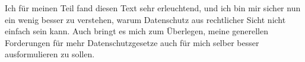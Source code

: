 \documentclass[a4paper,ngerman,11pt]{scrartcl}
\begin{document}
Ich für meinen Teil fand diesen Text sehr erleuchtend, und ich bin mir sicher
nun ein wenig besser zu verstehen, warum Datenschutz aus rechtlicher Sicht
nicht einfach sein kann. Auch bringt es mich zum Überlegen, meine generellen
Forderungen für mehr Datenschutzgesetze auch für mich selber besser
ausformulieren zu sollen.



\end{document}
